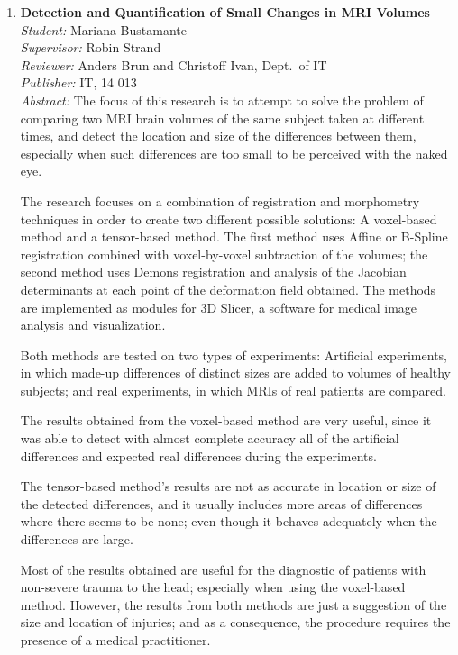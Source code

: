 \begin{small}
\begin{enumerate}
\item\textbf{Detection and Quantification of Small Changes in MRI Volumes}\\
  \emph{Student:} Mariana Bustamante\\
  \emph{Supervisor:} Robin Strand\\
  \emph{Reviewer:} Anders Brun and Christoff Ivan, Dept.~of IT\\
  \emph{Publisher:} IT, 14 013\\
  \emph{Abstract:} The focus of this research is to attempt to solve the problem of comparing two MRI brain volumes of the same subject taken at different times, and detect the location and size of the differences between them, especially when such differences are too small to be perceived with the naked eye.

The research focuses on a combination of registration and morphometry techniques in order to create two different possible solutions: A voxel-based method and a tensor-based method. The first method uses Affine or B-Spline registration combined with voxel-by-voxel subtraction of the volumes; the second method uses Demons registration and analysis of the Jacobian determinants at each point of the deformation field obtained. The methods are implemented as modules for 3D Slicer, a software for medical image analysis and visualization.

Both methods are tested on two types of experiments: Artificial experiments, in which made-up differences of distinct sizes are added to volumes of healthy subjects; and real experiments, in which MRIs of real patients are compared.

The results obtained from the voxel-based method are very useful, since it was able to detect with almost complete accuracy all of the artificial differences and expected real differences during the experiments.

The tensor-based method’s results are not as accurate in location or size of the detected  differences, and it usually includes more areas of differences where there seems to be none; even though it behaves adequately when the differences are large.

Most of the results obtained are useful for the diagnostic of patients with non-severe trauma to the head; especially when using the voxel-based method. However, the results from both methods are just a suggestion of the size and location of injuries; and as a consequence, the procedure  requires the presence of a medical practitioner.


\end{enumerate}
\end{small}
